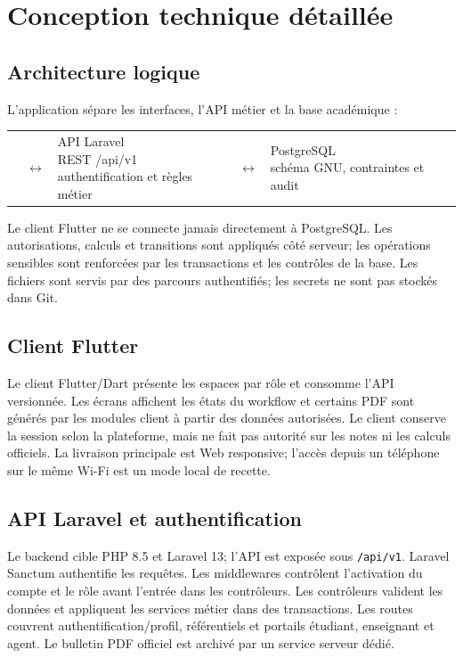 \documentclass[11pt,a4paper]{article}
\begin{document}
\section{Conception technique détaillée}

\subsection{Architecture logique}
L’application sépare les interfaces, l’API métier et la base académique :
\begin{center}
\footnotesize
\begin{tabularx}{0.94\textwidth}{>{\centering\arraybackslash}X c >{\centering\arraybackslash}X c >{\centering\arraybackslash}X}
\fbox{\parbox{0.22\textwidth}{\centering Flutter Web\\ espaces étudiant, enseignant et agent}} & $\longleftrightarrow$ &
\fbox{\parbox{0.22\textwidth}{\centering API Laravel\\ REST /api/v1\\ authentification et règles métier}} & $\longleftrightarrow$ &
\fbox{\parbox{0.22\textwidth}{\centering PostgreSQL\\ schéma GNU, contraintes et audit}} \\
\end{tabularx}
\end{center}
Le client Flutter ne se connecte jamais directement à PostgreSQL. Les autorisations, calculs et transitions sont appliqués côté serveur; les opérations sensibles sont renforcées par les transactions et les contrôles de la base. Les fichiers sont servis par des parcours authentifiés; les secrets ne sont pas stockés dans Git.

\subsection{Client Flutter}
Le client Flutter/Dart présente les espaces par rôle et consomme l’API versionnée. Les écrans affichent les états du workflow et certains PDF sont générés par les modules client à partir des données autorisées. Le client conserve la session selon la plateforme, mais ne fait pas autorité sur les notes ni les calculs officiels. La livraison principale est Web responsive; l’accès depuis un téléphone sur le même Wi-Fi est un mode local de recette.

\subsection{API Laravel et authentification}
Le backend cible PHP 8.5 et Laravel 13; l’API est exposée sous \texttt{/api/v1}. Laravel Sanctum authentifie les requêtes. Les middlewares contrôlent l’activation du compte et le rôle avant l’entrée dans les contrôleurs. Les contrôleurs valident les données et appliquent les services métier dans des transactions. Les routes couvrent authentification/profil, référentiels et portails étudiant, enseignant et agent. Le bulletin PDF officiel est archivé par un service serveur dédié.
\end{document}
